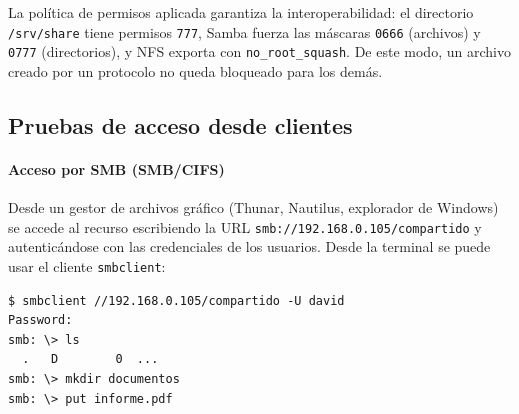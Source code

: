 \begin{table}[H]
\centering
\caption{Equivalencia de permisos: Windows vs. Unix}
\label{tab:permisos-unix}
\end{table}

La política de permisos aplicada garantiza la interoperabilidad: el directorio
\texttt{/srv/share} tiene permisos \texttt{777}, Samba fuerza las máscaras
\texttt{0666} (archivos) y \texttt{0777} (directorios), y NFS exporta con
\texttt{no\_root\_squash}. De este modo, un archivo creado por un protocolo
no queda bloqueado para los demás.

\subsection{Pruebas de acceso desde clientes}

\paragraph{Acceso por SMB (SMB/CIFS)}

Desde un gestor de archivos gráfico (Thunar, Nautilus, explorador de Windows)
se accede al recurso escribiendo la URL \texttt{smb://192.168.0.105/compartido}
y autenticándose con las credenciales de los usuarios. Desde la terminal se
puede usar el cliente \texttt{smbclient}:

\begin{lstlisting}[style=terminal]
$ smbclient //192.168.0.105/compartido -U david
Password:
smb: \> ls
  .   D        0  ...
smb: \> mkdir documentos
smb: \> put informe.pdf
\end{lstlisting}

